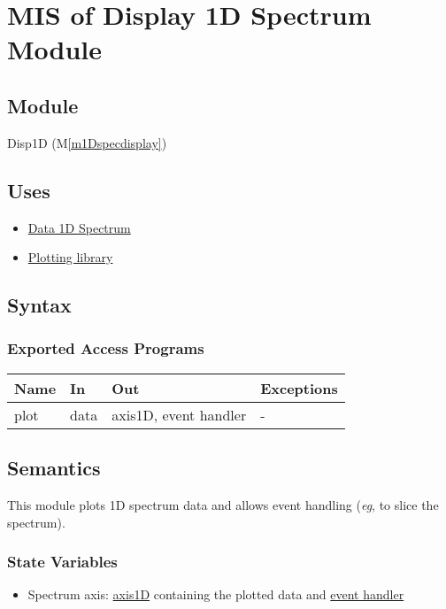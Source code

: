 \documentclass[12pt, titlepage]{article}
\newcommand{\mref}[1]{M\ref{#1}}
\begin{document}
\section{MIS of Display 1D Spectrum Module} \label{Mod:Disp1D}

\subsection{Module}

Disp1D (\mref{m1Dspecdisplay})

\subsection{Uses}
\begin{itemize}
    \item \hyperref[Mod:Spectrum]{Data 1D Spectrum}
    \item \hyperref[Mod:Plotting]{Plotting library}
\end{itemize}

\subsection{Syntax}

\subsubsection{Exported Access Programs}

\begin{center}
    \begin{tabular}{p{2cm} p{4cm} p{4cm} p{2cm}}
        \hline
        \textbf{Name} & \textbf{In} & \textbf{Out} & \textbf{Exceptions} \\
        \hline
        plot & data & axis1D, event handler & - \\
        \hline
    \end{tabular}
\end{center}

\subsection{Semantics}
This module plots 1D spectrum data and allows event handling (\textit{eg}, to
slice the spectrum).

\subsubsection{State Variables}
\begin{itemize}
    \item Spectrum axis: \hyperref[Mod:Plotting]{axis1D} containing the plotted
    data and \hyperref[Mod:Plotting]{event handler}
\end{itemize}
\end{document}
